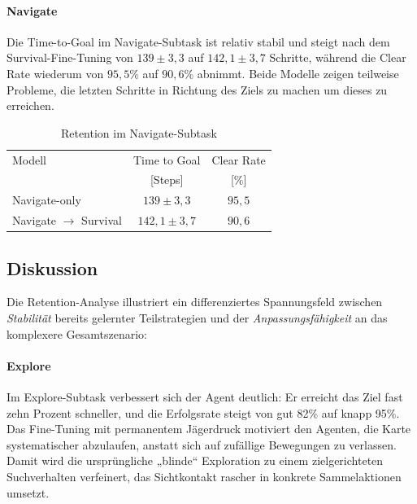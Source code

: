 \paragraph{Navigate}
Die Time-to-Goal im Navigate-Subtask ist relativ stabil und steigt nach dem Survival-Fine-Tuning von $139 \pm 3{,}3$ auf $142{,}1 \pm 3{,}7$ Schritte, während die Clear Rate wiederum von $95{,}5\%$ auf $90{,}6\%$ abnimmt. Beide Modelle zeigen teilweise Probleme, die letzten Schritte in Richtung des Ziels zu machen um dieses zu erreichen. 
\begin{table}[H]
  \centering\footnotesize
  \setlength{\tabcolsep}{4pt}
  \caption{Retention im Navigate-Subtask}
  \begin{tabular}{@{}lcc@{}}
    \toprule
    Modell                     & Time to Goal & Clear Rate  \\
                               & [Steps]      & [\%]        \\ 
    \midrule
    Navigate-only              & $139 \pm 3{,}3$   & $95{,}5$  \\
    Navigate \(\rightarrow\) Survival & $142{,}1 \pm 3{,}7$ & $90{,}6$  \\
    \bottomrule
  \end{tabular}
\end{table}

\subsection{Diskussion}
Die Retention-Analyse illustriert ein differenziertes Spannungsfeld zwischen \emph{Stabilität} bereits gelernter Teilstrategien und der \emph{Anpassungsfähigkeit} an das komplexere Gesamtszenario:


\paragraph{Explore}  
Im Explore-Subtask verbessert sich der Agent deutlich: Er erreicht das Ziel fast zehn Prozent schneller, und die Erfolgsrate steigt von gut 82\% auf knapp 95\%. Das Fine-Tuning mit permanentem Jägerdruck motiviert den Agenten, die Karte systematischer abzulaufen, anstatt sich auf zufällige Bewegungen zu verlassen. Damit wird die ursprüngliche „blinde“ Exploration zu einem zielgerichteten Suchverhalten verfeinert, das Sichtkontakt rascher in konkrete Sammelaktionen umsetzt.

